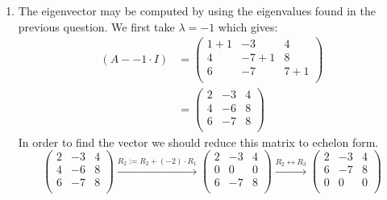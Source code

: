 \documentclass[a4paper]{article}
\begin{document}
\begin{enumerate}
  \item The eigenvector may be computed by using the eigenvalues found in the previous question. We first take $\lambda = -1$ which gives:
  \begin{align*}
    (A - - 1 \cdot I) &=
    \left(
    \begin{array}{rrr}
    1 + 1 & -3 & 4 \\
    4 & -7 + 1 & 8 \\
    6 & -7 & 7 + 1 \\
    \end{array}
    \right) \\
    &=
    \left(
    \begin{array}{rrr}
    2 & -3 & 4 \\
    4 & -6 & 8 \\
    6 & -7 & 8 \\
    \end{array}
    \right)
  \end{align*}
  In order to find the vector we should reduce this matrix to echelon form.
  \[
  \left(
  \begin{array}{rrr}
  2 & -3 & 4 \\
  4 & -6 & 8 \\
  6 & -7 & 8 \\
  \end{array}
  \right)
  \xrightarrow{R_2 := R_2 + (-2) \cdot R_1}
  \left(
  \begin{array}{rrr}
  2 & -3 & 4 \\
  0 & 0 & 0 \\
  6 & -7 & 8 \\
  \end{array}
  \right)
  \xrightarrow{R_2 \leftrightarrow R_3}
  \left(
  \begin{array}{rrr}
  2 & -3 & 4 \\
  6 & -7 & 8 \\
  0 & 0 & 0 \\
  \end{array}
  \right)
\]
\end{enumerate}
\end{document}

